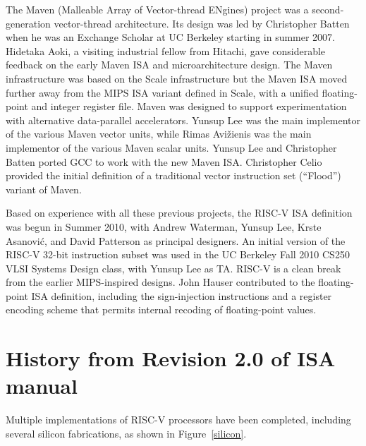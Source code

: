 The Maven (Malleable Array of Vector-thread ENgines) project was a
second-generation vector-thread architecture.  Its design was led by
Christopher Batten when he was an Exchange Scholar at UC Berkeley starting
in summer 2007.  Hidetaka Aoki, a visiting industrial fellow from
Hitachi, gave considerable feedback on the early Maven ISA and
microarchitecture design.  The Maven infrastructure was based on the
Scale infrastructure but the Maven ISA moved further away from the
MIPS ISA variant defined in Scale, with a unified floating-point and
integer register file.  Maven was designed to support experimentation
with alternative data-parallel accelerators.  Yunsup Lee was the main
implementor of the various Maven vector units, while Rimas Avi\v{z}ienis
was the main implementor of the various Maven scalar units.
Yunsup Lee and Christopher Batten ported GCC to work with the new
Maven ISA.  Christopher Celio provided the initial definition of a
traditional vector instruction set (``Flood'') variant of Maven.

Based on experience with all these previous projects, the RISC-V ISA
definition was begun in Summer 2010, with Andrew Waterman, Yunsup Lee,
Krste Asanovi\'{c}, and David Patterson as principal designers.
An initial version of the RISC-V
32-bit instruction subset was used in the UC Berkeley Fall 2010 CS250
VLSI Systems Design class, with Yunsup Lee as TA.  RISC-V is a clean
break from the earlier MIPS-inspired designs.  John Hauser contributed
to the floating-point ISA definition, including the sign-injection
instructions and a register encoding scheme that permits
internal recoding of floating-point values.

\section{History from Revision 2.0 of ISA manual}

Multiple implementations of RISC-V processors have been completed,
including several silicon fabrications, as shown in
Figure~\ref{silicon}.

